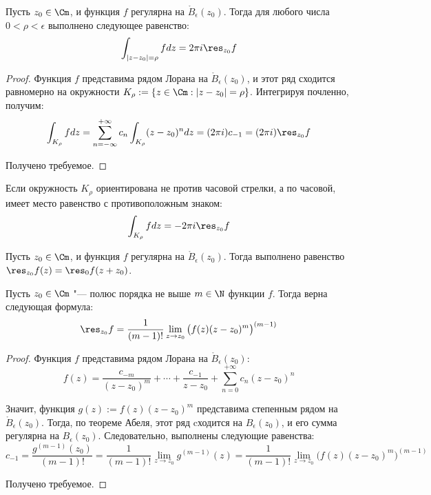 \begin{proposition}
	Пусть $z_0 \in \Cm$, и функция $f$ регулярна на $\mathring B_\epsilon(z_0)$. Тогда для любого числа $0 < \rho < \epsilon$ выполнено следующее равенство:
	\[\int_{|z - z_0| = \rho}fdz = 2\pi i\res_{z_0}f\]
\end{proposition}

\begin{proof}
	Функция $f$ представима рядом Лорана на $\mathring B_\epsilon(z_0)$, и этот ряд сходится равномерно на окружности $K_\rho:= \{z \in \Cm: |z - z_0| = \rho\}$. Интегрируя почленно, получим:
	\[\int_{K_\rho}fdz = \sum\limits_{n = -\infty}^{+\infty}c_n\int_{K_\rho}(z-z_0)^ndz = (2\pi i)c_{-1} = (2\pi i)\res_{z_0}f\]
	
	Получено требуемое.
\end{proof}

\begin{note}
	Если окружность $K_\rho$ ориентирована не против часовой стрелки, а по часовой, имеет место равенство с противоположным знаком:
	\[\int_{K_\rho}fdz = -2\pi i\res_{z_0}f\]
\end{note}

\begin{note}
	Пусть $z_0 \in \Cm$, и функция $f$ регулярна на $\mathring B_\epsilon(z_0)$. Тогда выполнено равенство $\res_{z_0}f(z) = \res_0f(z + z_0)$.
\end{note}

\begin{proposition}
	Пусть $z_0 \in \Cm$ "--- полюс порядка не выше $m \in \N$ функции $f$. Тогда верна следующая формула:
	\[\res_{z_0}f = \frac{1}{(m-1)!}\lim_{z \to z_0}\big(f(z)(z - z_0)^m\big)^{(m-1)}\]
\end{proposition}

\begin{proof}
	Функция $f$ представима рядом Лорана на $\mathring B_\epsilon(z_0)$:
	\[f(z) = \frac{c_{-m}}{(z-z_0)^m} + \dotsb + \frac{c_{-1}}{z-z_0} + \sum_{n = 0}^{+\infty}c_n(z - z_0)^n\]
	
	Значит, функция $g(z) := f(z)(z-z_0)^m$ представима степенным рядом на $\mathring B_\epsilon(z_0)$. Тогда, по теореме Абеля, этот ряд cходится на $B_\epsilon(z_0)$, и его сумма регулярна на $B_\epsilon(z_0)$. Следовательно, выполнены следующие равенства:
	\[c_{-1} = \frac{g^{(m-1)}(z_0)}{(m-1)!} = \frac1{{(m-1)!}}\lim_{z \to z_0}g^{(m-1)}(z) = \frac{1}{(m-1)!}\lim_{z \to z_0}\big(f(z)(z - z_0)^m\big)^{(m-1)}\]
	
	Получено требуемое.
\end{proof}

